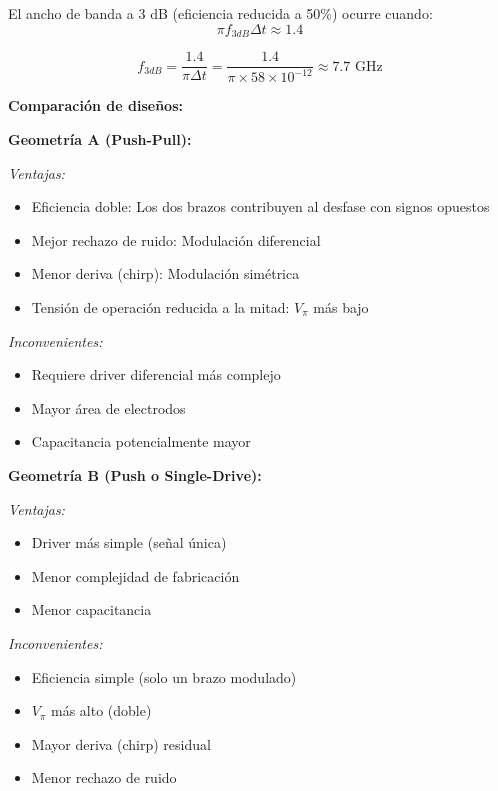 \documentclass[12pt,a4paper]{article}
\begin{document}
\begin{enumerate}
\begin{enumerate}
    El ancho de banda a 3 dB (eficiencia reducida a 50\%) ocurre cuando:
    \begin{equation}
        \pi f_{3dB} \Delta t \approx 1.4
    \end{equation}
    
    \begin{equation}
        f_{3dB} = \frac{1.4}{\pi \Delta t} = \frac{1.4}{\pi \times 58 \times 10^{-12}} \approx 7.7 \text{ GHz}
    \end{equation}
\end{enumerate}

\textbf{Comparación de diseños:}

\textbf{Geometría A (Push-Pull):}

\textit{Ventajas:}
\begin{itemize}
    \item Eficiencia doble: Los dos brazos contribuyen al desfase con signos opuestos
    \item Mejor rechazo de ruido: Modulación diferencial
    \item Menor deriva (chirp): Modulación simétrica
    \item Tensión de operación reducida a la mitad: $V_\pi$ más bajo
\end{itemize}

\textit{Inconvenientes:}
\begin{itemize}
    \item Requiere driver diferencial más complejo
    \item Mayor área de electrodos
    \item Capacitancia potencialmente mayor
\end{itemize}

\textbf{Geometría B (Push o Single-Drive):}

\textit{Ventajas:}
\begin{itemize}
    \item Driver más simple (señal única)
    \item Menor complejidad de fabricación
    \item Menor capacitancia
\end{itemize}

\textit{Inconvenientes:}
\begin{itemize}
    \item Eficiencia simple (solo un brazo modulado)
    \item $V_\pi$ más alto (doble)
    \item Mayor deriva (chirp) residual
    \item Menor rechazo de ruido
\end{itemize}


\end{enumerate}
\end{document}
